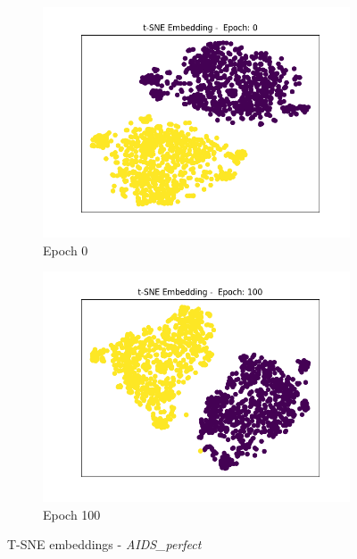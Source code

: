 		\begin{figure}[H]
			\centering
			\begin{subfigure}{0.49\textwidth}
				\centering
				\includegraphics[width=1.1\linewidth]{images/plotA0_tSNE_e0_i0_AIDSPerfect_E_GDL_09_22h-03m}
				\caption{Epoch 0}
				\label{fig:plota0tsnee0i0aidsperfectegdl0922h-03m}
			\end{subfigure}
			\begin{subfigure}{0.49\textwidth}
				\centering
				\includegraphics[width=1.1\linewidth]{images/plotA0_tSNE_e100_i10_AIDSPerfect_E_GDL_09_22h-03m}
				\caption{Epoch 100}
				\label{fig:plota0tsnee100i10aidsperfectegdl0922h-03m}
			\end{subfigure}
			\caption{T-SNE embeddings - \textit{AIDS\_perfect}}
			\label{fig:TSNEAIDSperfect}
		\end{figure}
		

